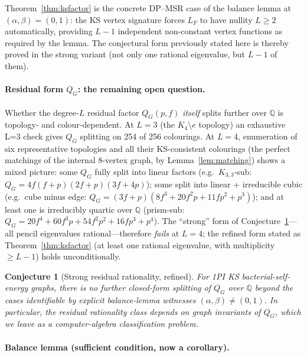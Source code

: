 \documentclass[11pt,a4paper]{article}
\theoremstyle{plain}
\newtheorem{conjecture}[theorem]{Conjecture}
\begin{document}
Theorem~\ref{thm:ksfactor} is the concrete DP--MSR case of the
balance lemma at $(\alpha, \beta) = (0, 1)$: the KS vertex
signature forces $L_F$ to have nullity $L \geq 2$ automatically,
providing $L - 1$ independent non-constant vertex functions as
required by the lemma.  The conjectural form previously stated
here is thereby proved in the strong variant (not only one
rational eigenvalue, but $L-1$ of them).

\paragraph{Residual form $Q_G$: the remaining open question.}
Whether the degree-$L$ residual factor $Q_G(p,f)$ \emph{itself}
splits further over $\mathbb{Q}$ is topology- and colour-dependent.
At $L = 3$ (the $K_4 \setminus e$ topology) an exhaustive L=3
check gives $Q_G$ splitting on 254 of 256 colourings.  At $L = 4$,
enumeration of six representative topologies and all their
KS-consistent colourings (the perfect matchings of the internal
8-vertex graph, by Lemma~\ref{lem:matching}) shows a mixed
picture: some $Q_G$ fully split into linear factors (e.g.\
$K_{3,3}$-sub: $Q_G = 4f(f+p)(2f+p)(3f+4p)$); some split into
linear + irreducible cubic (e.g.\ cube minus edge:
$Q_G = (3f+p)(8f^3 + 20f^2 p + 11 f p^2 + p^3)$); and at least
one is irreducibly quartic over $\mathbb{Q}$ (prism-sub:
$Q_G = 20f^4 + 60 f^3 p + 54 f^2 p^2 + 16 f p^3 + p^4$).  The
``strong'' form of Conjecture~\ref{conj:twocolour}---all pencil
eigenvalues rational---therefore \emph{fails} at $L = 4$; the
refined form stated as Theorem~\ref{thm:ksfactor} (at least one
rational eigenvalue, with multiplicity $\geq L - 1$) holds
unconditionally.

\begin{conjecture}[Strong residual rationality, refined]
\label{conj:twocolour}
For 1PI KS bacterial-self-energy graphs, there is no further
closed-form splitting of $Q_G$ over $\mathbb{Q}$ beyond the
cases identifiable by explicit balance-lemma witnesses
$(\alpha, \beta) \neq (0, 1)$.  In particular, the residual
rationality class depends on graph invariants of $Q_G$, which we
leave as a computer-algebra classification problem.
\end{conjecture}

\paragraph{Balance lemma (sufficient condition, now a corollary).}
\end{document}
